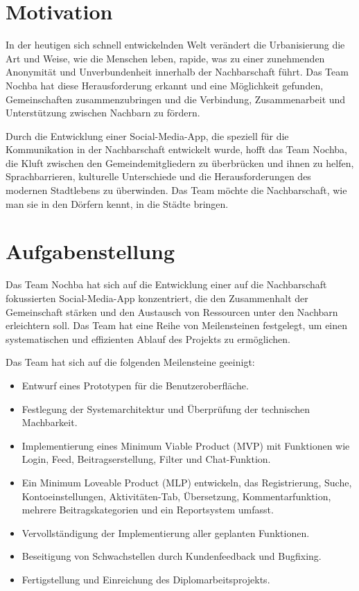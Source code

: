 
\section{Motivation}

In der heutigen sich schnell entwickelnden Welt verändert die Urbanisierung die Art und Weise, wie die Menschen leben, rapide, was zu einer zunehmenden Anonymität und Unverbundenheit innerhalb der Nachbarschaft führt. Das Team Nochba hat diese Herausforderung erkannt und eine Möglichkeit gefunden, Gemeinschaften zusammenzubringen und die Verbindung, Zusammenarbeit und Unterstützung zwischen Nachbarn zu fördern.

Durch die Entwicklung einer Social-Media-App, die speziell für die Kommunikation in der Nachbarschaft entwickelt wurde, hofft das Team Nochba, die Kluft zwischen den Gemeindemitgliedern zu überbrücken und ihnen zu helfen, Sprachbarrieren, kulturelle Unterschiede und die Herausforderungen des modernen Stadtlebens zu überwinden. Das Team möchte die Nachbarschaft, wie man sie in den Dörfern kennt, in die Städte bringen.

\section{Aufgabenstellung}

Das Team Nochba hat sich auf die Entwicklung einer auf die Nachbarschaft fokussierten Social-Media-App konzentriert, die den Zusammenhalt der Gemeinschaft stärken und den Austausch von Ressourcen unter den Nachbarn erleichtern soll. Das Team hat eine Reihe von Meilensteinen festgelegt, um einen systematischen und effizienten Ablauf des Projekts zu ermöglichen.

Das Team hat sich auf die folgenden Meilensteine geeinigt:

\begin{itemize}
    \item {Entwurf eines Prototypen für die Benutzeroberfläche.}
    \item {Festlegung der Systemarchitektur und Überprüfung der technischen Machbarkeit.}
    \item {Implementierung eines Minimum Viable Product (MVP) mit Funktionen wie Login, Feed, Beitragserstellung, Filter und Chat-Funktion.}
    \item {Ein Minimum Loveable Product (MLP) entwickeln, das Registrierung, Suche, Kontoeinstellungen, Aktivitäten-Tab, Übersetzung, Kommentarfunktion, mehrere Beitragskategorien und ein Reportsystem umfasst.}
    \item {Vervollständigung der Implementierung aller geplanten Funktionen.}
    \item {Beseitigung von Schwachstellen durch Kundenfeedback und Bugfixing.}
    \item {Fertigstellung und Einreichung des Diplomarbeitsprojekts.}
\end{itemize}

